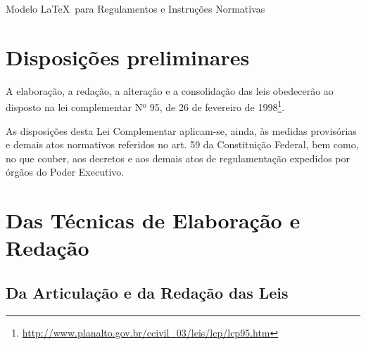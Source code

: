 \documentclass[11pt,twoside,a4paper]{inifsc}
\begin{document}
\begin{normativa}{Modelo \LaTeX~para Regulamentos e Instruções Normativas}

\chapter{Disposições preliminares}

\begin{artigo}
    \item A elaboração, a redação, a alteração e a consolidação das leis obedecerão ao disposto na lei complementar Nº 95, de 26 de fevereiro de 1998\footnote{\url{http://www.planalto.gov.br/ccivil_03/leis/lcp/lcp95.htm}}.
    \begin{artigo}
        \item As disposições desta Lei Complementar aplicam-se, ainda, às medidas provisórias e demais atos normativos referidos no art. 59 da Constituição Federal, bem como, no que couber, aos decretos e aos demais atos de regulamentação expedidos por órgãos do Poder Executivo.
    \end{artigo}
\end{artigo}


\chapter{Das Técnicas de Elaboração e Redação}


\section{Da Articulação e da Redação das Leis}



\end{normativa}
\end{document}
